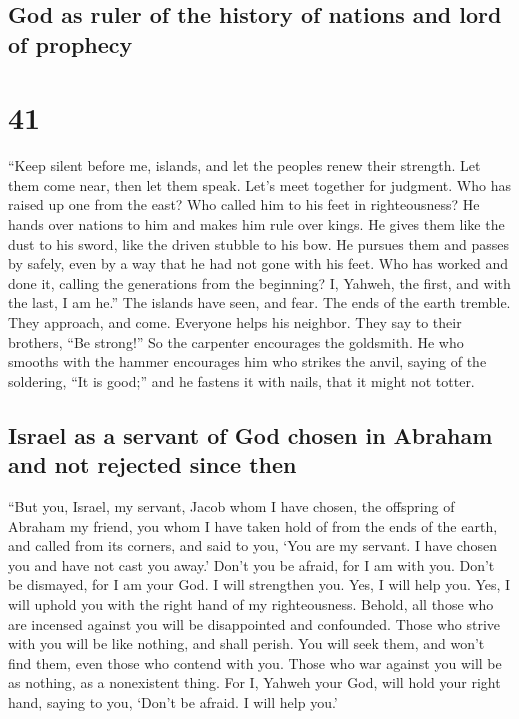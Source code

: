 \hypertarget{god-as-ruler-of-the-history-of-nations-and-lord-of-prophecy}{%
\subsection{God as ruler of the history of nations and lord of
prophecy}\label{god-as-ruler-of-the-history-of-nations-and-lord-of-prophecy}}

\hypertarget{section-40}{%
\section{41}\label{section-40}}

 ``Keep silent before me, islands, and let the peoples
renew their strength. Let them come near, then let them speak. Let's
meet together for judgment.  Who has raised up one from
the east? Who called him to his feet in righteousness? He hands over
nations to him and makes him rule over kings. He gives them like the
dust to his sword, like the driven stubble to his bow.  He
pursues them and passes by safely, even by a way that he had not gone
with his feet.  Who has worked and done it, calling the
generations from the beginning? I, Yahweh, the first, and with the last,
I am he.''  The islands have seen, and fear. The ends of
the earth tremble. They approach, and come.  Everyone
helps his neighbor. They say to their brothers, ``Be strong!''
 So the carpenter encourages the goldsmith. He who smooths
with the hammer encourages him who strikes the anvil, saying of the
soldering, ``It is good;'' and he fastens it with nails, that it might
not totter.

\hypertarget{israel-as-a-servant-of-god-chosen-in-abraham-and-not-rejected-since-then}{%
\subsection{Israel as a servant of God chosen in Abraham and not
rejected since
then}\label{israel-as-a-servant-of-god-chosen-in-abraham-and-not-rejected-since-then}}

 ``But you, Israel, my servant, Jacob whom I have chosen,
the offspring of Abraham my friend,  you whom I have taken
hold of from the ends of the earth, and called from its corners, and
said to you, `You are my servant. I have chosen you and have not cast
you away.'  Don't you be afraid, for I am with you. Don't
be dismayed, for I am your God. I will strengthen you. Yes, I will help
you. Yes, I will uphold you with the right hand of my righteousness.
 Behold, all those who are incensed against you will be
disappointed and confounded. Those who strive with you will be like
nothing, and shall perish.  You will seek them, and won't
find them, even those who contend with you. Those who war against you
will be as nothing, as a nonexistent thing.  For I,
Yahweh your God, will hold your right hand, saying to you, `Don't be
afraid. I will help you.'

